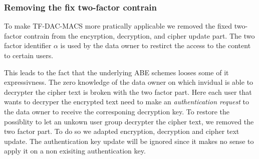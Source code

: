\subsubsection{Removing the fix two-factor contrain}
To make \ac{TF-DAC-MACS} more pratically applicable we removed the fixed two-factor contrain from the encyrption, decryption, and cipher update part. The two factor identifier $\alpha$ is used by the data owner to restirct the access to the content to certain users. 

This leads to the fact that the underlying \ac{ABE} schemes looses some of it expressivness. The zero knowledge of the data owner on which invidual is able to decrypter the cipher text is broken with the two factor part. Here each user that wants to decryper the encrypted text need to make an \textit{authentication request} to the data owner to receive the corresponing decryption key. To restore the possiblity to let an unkown user group decrypter the cipher text, we removed the two factor part. To do so we adapted encryption, decryption and cipher text update. The authentication key update will be ignored since it makes no sense to apply it on a non exisiting authentication key. 

